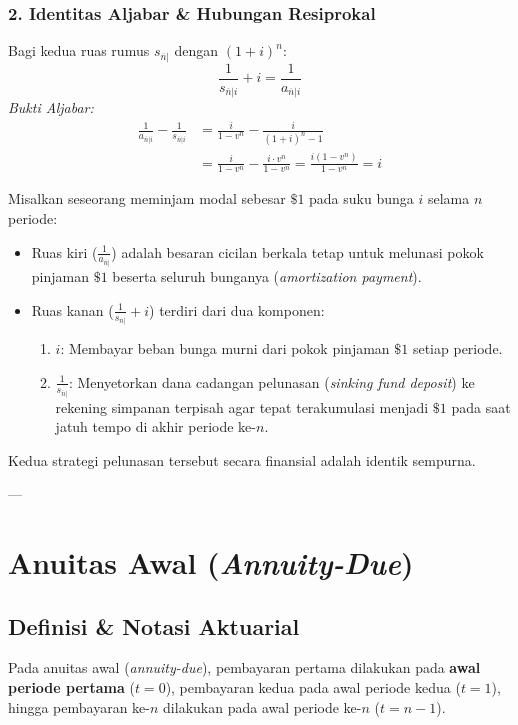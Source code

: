 \documentclass[11pt,a4paper]{article}
\begin{document}
\subsubsection{2. Identitas Aljabar \& Hubungan Resiprokal}
Bagi kedua ruas rumus $s_{\overline{n}|}$ dengan $(1+i)^n$:
\begin{equation}
    \frac{1}{s_{\overline{n}|i}} + i = \frac{1}{a_{\overline{n}|i}}
\end{equation}
\textit{Bukti Aljabar:}
\begin{align*}
    \frac{1}{a_{\overline{n}|i}} - \frac{1}{s_{\overline{n}|i}} &= \frac{i}{1 - v^n} - \frac{i}{(1+i)^n - 1} \\
    &= \frac{i}{1 - v^n} - \frac{i \cdot v^n}{1 - v^n} = \frac{i(1 - v^n)}{1 - v^n} = i
\end{align*}

\begin{notebox}[Interpretasi Keuangan Hubungan Resiprokal: $\frac{1}{a_{\overline{n}|}} = \frac{1}{s_{\overline{n}|}} + i$]
Misalkan seseorang meminjam modal sebesar $\$1$ pada suku bunga $i$ selama $n$ periode:
\begin{itemize}
    \item Ruas kiri ($\frac{1}{a_{\overline{n}|}}$) adalah besaran cicilan berkala tetap untuk melunasi pokok pinjaman $\$1$ beserta seluruh bunganya (\textit{amortization payment}).
    \item Ruas kanan ($\frac{1}{s_{\overline{n}|}} + i$) terdiri dari dua komponen:
    \begin{enumerate}
        \item $i$: Membayar beban bunga murni dari pokok pinjaman $\$1$ setiap periode.
        \item $\frac{1}{s_{\overline{n}|}}$: Menyetorkan dana cadangan pelunasan (\textit{sinking fund deposit}) ke rekening simpanan terpisah agar tepat terakumulasi menjadi $\$1$ pada saat jatuh tempo di akhir periode ke-$n$.
    \end{enumerate}
\end{itemize}
Kedua strategi pelunasan tersebut secara finansial adalah identik sempurna.
\end{notebox}

---

\section{Anuitas Awal (\textit{Annuity-Due})}

\subsection{Definisi \& Notasi Aktuarial}
Pada anuitas awal (\textit{annuity-due}), pembayaran pertama dilakukan pada \textbf{awal periode pertama} ($t = 0$), pembayaran kedua pada awal periode kedua ($t = 1$), hingga pembayaran ke-$n$ dilakukan pada awal periode ke-$n$ ($t = n - 1$).
\end{document}
